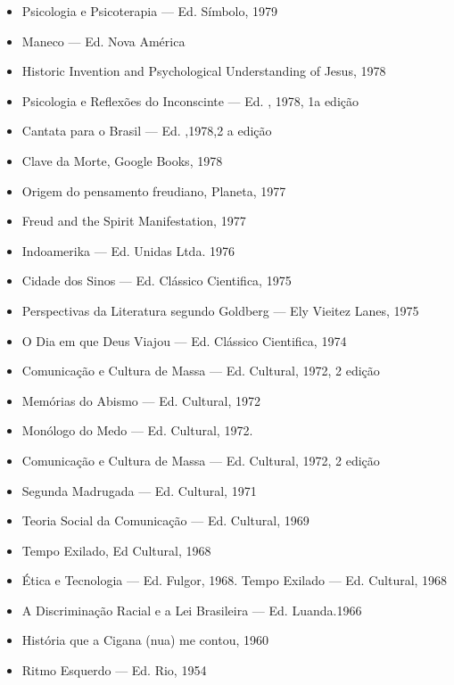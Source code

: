 \begin{itemize}
\item
  Psicologia e Psicoterapia --- Ed. Símbolo, 1979
\item
  Maneco --- Ed. Nova América
\item
  Historic Invention and Psychological Understanding of Jesus, 1978
\item
  Psicologia e Reflexões do Inconscinte --- Ed. , 1978, 1a edição
\item
  Cantata para o Brasil --- Ed. ,1978,2 a edição
\item
  Clave da Morte, Google Books, 1978
\item
  Origem do pensamento freudiano, Planeta, 1977
\item
  Freud and the Spirit Manifestation, 1977
\item
  Indoamerika --- Ed. Unidas Ltda. 1976
\item
  Cidade dos Sinos --- Ed. Clássico Cientifica, 1975
\item
  Perspectivas da Literatura segundo Goldberg --- Ely Vieitez Lanes,
  1975
\item
  O Dia em que Deus Viajou --- Ed. Clássico Cientifica, 1974
\item
  Comunicação e Cultura de Massa --- Ed. Cultural, 1972, 2 edição
\item
  Memórias do Abismo --- Ed. Cultural, 1972
\item
  Monólogo do Medo --- Ed. Cultural, 1972.
\item
  Comunicação e Cultura de Massa --- Ed. Cultural, 1972, 2 edição
\item
  Segunda Madrugada --- Ed. Cultural, 1971
\item
  Teoria Social da Comunicação --- Ed. Cultural, 1969
\item
  Tempo Exilado, Ed Cultural, 1968
\item
  Ética e Tecnologia --- Ed. Fulgor, 1968. Tempo Exilado --- Ed.
  Cultural, 1968
\item
  A Discriminação Racial e a Lei Brasileira --- Ed. Luanda.1966
\item
  História que a Cigana (nua) me contou, 1960
\item
  Ritmo Esquerdo --- Ed. Rio, 1954
\end{itemize}


